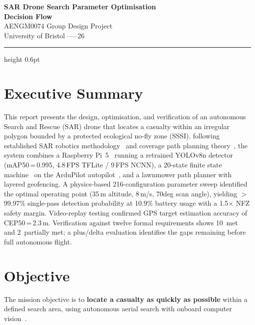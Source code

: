 \documentclass[10pt,a4paper]{article}
\def\textdegree{deg}%
\begin{document}
\begin{center}
  {\LARGE\bfseries\color{headblue} SAR Drone Search Parameter Optimisation\\[3pt] Decision Flow}\\[4pt]
  {\large AENGM0074 Group Design Project}\\[2pt]
  {\small University of Bristol \quad-----26}
\end{center}
\vspace{2pt}
\hrule height 0.6pt
\vspace{4pt}

\section*{Executive Summary}\label{sec:exec-summary}

This report presents the design, optimisation, and verification of an autonomous Search and Rescue (SAR) drone that locates a casualty within an irregular polygon bounded by a protected ecological no-fly zone (SSSI). following established SAR robotics methodology~\cite{murphy2014,lyu2023uav_sar_survey} and coverage path planning theory~\cite{galceran2013survey}, the system combines a Raspberry Pi~5~\cite{raspberrypi5} running a retrained YOLOv8n detector~\cite{yolov8} (mAP50\,=\,0.995, 4.8\,FPS TFLite / 9\,FPS NCNN), a 20-state finite state machine~\cite{wagner2006fsm} on the ArduPilot autopilot~\cite{ardupilot}, and a lawnmower path planner with layered geofencing. A physics-based 216-configuration parameter sweep identified the optimal operating point (35\,m altitude, 8\,m/s, 70\textdegree{} scan angle), yielding $>$99.97\% single-pass detection probability at 10.9\% battery usage with a 1.5$\times$ NFZ safety margin. Video-replay testing confirmed GPS target estimation accuracy of CEP50\,=\,2.3\,m. Verification against twelve formal requirements shows 10~met and 2~partially met; a plus/delta evaluation identifies the gaps remaining before full autonomous flight.

\section{Objective}\label{sec:df-objective}

The mission objective is to \textbf{locate a casualty as quickly as possible} within a defined search area, using autonomous aerial search with onboard computer vision~\citep{goodrich2008,lyu2023uav_sar_survey}.
\end{document}
